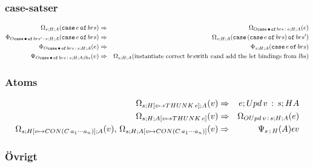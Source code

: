 \documentclass[../Optimise]{subfiles}
\begin{document}
\subsubsection{case-satser}
\begin{align*}
\Omega_{s;H;A}(\mathtt{case}\,e\,\mathtt{of}\,brs) & \Rightarrow & \Omega_{O\mathtt{case}\,\bullet\,\mathtt{of}\,brs\,:\,s;H;A}(e)\\
\Phi_{O\mathtt{case}\,\bullet\,\mathtt{of}\,brs'\,:\,s;H;A}(\mathtt{case}\,e\,\mathtt{of}\,brs) & \Rightarrow & \Omega_{s;H;A}(\mathtt{case}\,(\mathtt{case}\,e\,\mathtt{of}\,brs)\,\mathtt{of}\,brs')\\
\Phi_{O\mathtt{case}\,\bullet\,\mathtt{of}\,brs\,:\,s;H;A}(e) & \Rightarrow & \Phi_{s;H;A}(\mathtt{case}\,e\,\mathtt{of}\,brs)\\
\Psi_{O\mathtt{case}\,\bullet\,\mathtt{of}\,brs\,:\,s;H;A;lbs}(v) & \Rightarrow & \Omega_{s;H;A}(\mbox{instantiate correct \ensuremath{brs}with \ensuremath{v}and add the let bindings from \ensuremath{lbs}})\\
\end{align*}


\subsubsection{Atoms}
\begin{align*}
\Omega_{s;H[v\mapsto THUNK\,e];A}(v) & \Rightarrow & e;Upd\,v\,:\,s;HA\\
\Omega_{s;H;A[v\mapsto THUNK\,e]}(v) & \Rightarrow & \Omega_{OUpd\,v\,:\,s;H;A}(e)\\
\Omega_{s;H[v\mapsto CON(C\, a_{1}\cdots a_{n})];A}(v),\,\Omega_{s;H;A[v\mapsto CON(C\, a_{1}\cdots a_{n})]}(v) & \Rightarrow & \Psi_{s\,;\,H}(A){\epsilon}v\\
\end{align*}

\subsubsection{Övrigt}





\end{document}
